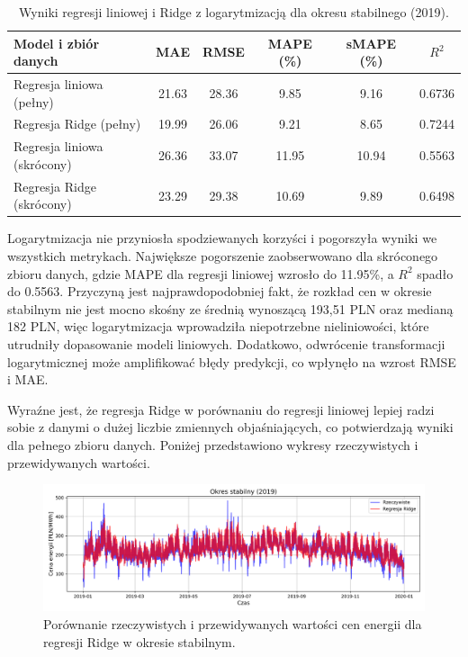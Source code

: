 \begin{table}[h]
    \centering
    \caption{Wyniki regresji liniowej i Ridge z logarytmizacją dla okresu stabilnego (2019).}
    \label{tab:linear_ridge_results_log}
    \begin{tabular}{|l|ccccc|}
        \hline
        \textbf{Model i zbiór danych} & \textbf{MAE} & \textbf{RMSE} & \textbf{MAPE (\%)} & \textbf{sMAPE (\%)} & \textbf{\(R^2\)} \\
        \hline
        Regresja liniowa (pełny)   & 21.63 & 28.36 & 9.85 & 9.16 & 0.6736 \\
        Regresja Ridge (pełny)     & 19.99 & 26.06 & 9.21 & 8.65 & 0.7244 \\
        Regresja liniowa (skrócony) & 26.36 & 33.07 & 11.95 & 10.94 & 0.5563 \\
        Regresja Ridge (skrócony)   & 23.29 & 29.38 & 10.69 & 9.89 & 0.6498 \\
        \hline
    \end{tabular}
\end{table}

Logarytmizacja nie przyniosła spodziewanych korzyści i pogorszyła wyniki we wszystkich metrykach. Największe pogorszenie zaobserwowano dla skróconego zbioru danych, gdzie MAPE dla regresji liniowej wzrosło do 11.95\%, a \(R^2\) spadło do 0.5563. Przyczyną jest najprawdopodobniej fakt, że rozkład cen w okresie stabilnym nie jest mocno skośny ze średnią wynoszącą 193,51 PLN oraz medianą 182 PLN, więc logarytmizacja wprowadziła niepotrzebne nieliniowości, które utrudniły dopasowanie modeli liniowych. Dodatkowo, odwrócenie transformacji logarytmicznej może amplifikować błędy predykcji, co wpłynęło na wzrost RMSE i MAE.

Wyraźne jest, że regresja Ridge w porównaniu do regresji liniowej lepiej radzi sobie z danymi o dużej liczbie zmiennych objaśniających, co potwierdzają wyniki dla pełnego zbioru danych. Poniżej przedstawiono wykresy rzeczywistych i przewidywanych wartości.

\begin{figure}[H]
    \centering
    \includegraphics[width=1.0\textwidth]{../../plots/predicts/ridge_predictions_full_stable_period.png}
    \caption{Porównanie rzeczywistych i przewidywanych wartości cen energii dla regresji Ridge w okresie stabilnym.}
    \label{fig:ridge_predictions_full_stable_period}
\end{figure}

